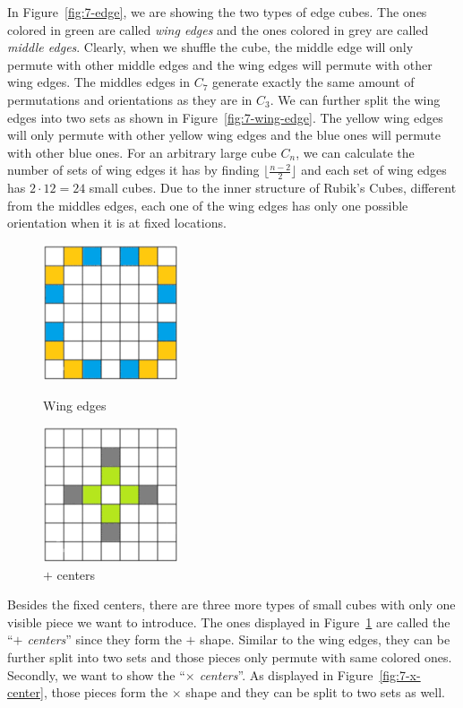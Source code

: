In Figure~\ref{fig:7-edge}, we are showing the two types of edge cubes. The ones colored in green are called \textit{wing edges} and the ones colored in grey are called \textit{middle edges}. Clearly, when we shuffle the cube, the middle edge will only permute with other middle edges and the wing edges will permute with other wing edges. The middles edges in $C_7$ generate exactly the same amount of permutations and orientations as they are in $C_3$. We can further split the wing edges into two sets as shown in Figure~\ref{fig:7-wing-edge}. The yellow wing edges will only permute with other yellow wing edges and the blue ones will permute with other blue ones. For an arbitrary large cube $C_n$, we can calculate the number of sets of wing edges it has by finding $\lfloor \frac{n - 2}{2} \rfloor$ and each set of wing edges has $2 \cdot 12 = 24$ small cubes. Due to the inner structure of Rubik's Cubes, different from the middles edges, each one of the wing edges has only one possible orientation when it is at fixed locations.
\begin{figure}[ht]
    \centering
    \begin{minipage}{0.45\textwidth}
        \centering
        \includegraphics[width=4cm]{figures/structure/7_grid_wing_edge.png}
        \caption{Wing edges}\label{fig:7-wing-edge}
    \end{minipage}
    \begin{minipage}{0.45\textwidth}
        \centering
        \includegraphics[width=4cm]{figures/structure/7_grid_plus_center.png}
        \caption{$+$ centers}\label{fig:7-plus-center}
    \end{minipage}
\end{figure}
\par Besides the fixed centers, there are three more types of small cubes with only one visible piece we want to introduce. The ones displayed in Figure~\ref{fig:7-plus-center} are called the ``\textit{$+$ centers}'' since they form the $+$ shape. Similar to the wing edges, they can be further split into two sets and those pieces only permute with same colored ones. Secondly, we want to show the ``\textit{$\times$ centers}''. As displayed in Figure~\ref{fig:7-x-center}, those pieces form the $\times$ shape and they can be split to two sets as well.
